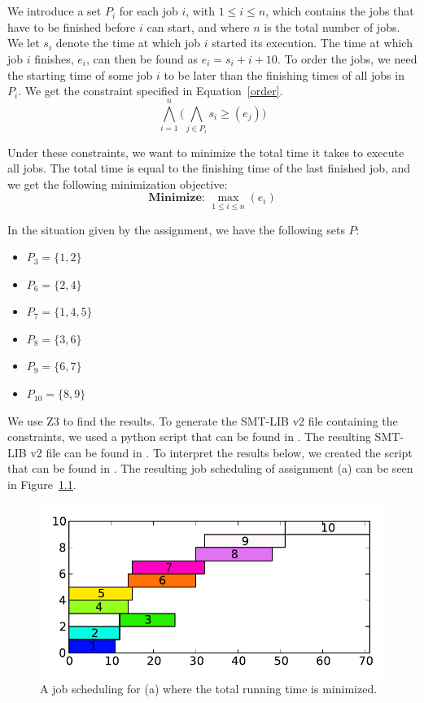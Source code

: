 \chapter{}\label{chp:3}
We introduce a set $P_i$ for each job $i$, with $1 \leq i \leq n$, which contains the jobs that have to be finished before $i$ can start, and where $n$ is the total number of jobs. We let $s_i$ denote the time at which job $i$ started its execution. The time at which job $i$ finishes, $e_i$, can then be found as $e_i = s_i + i + 10$. To order the jobs, we need the starting time of some job $i$ to be later than the finishing times of all jobs in $P_i$. We get the constraint specified in Equation~\ref{order}.
\begin{equation}
    \label{order}
    \bigwedge^{n}_{i=1}\big(\bigwedge_{j\in P_i} s_i \geq (e_j)\big)
\end{equation}

Under these constraints, we want to minimize the total time it takes to execute all jobs. The total time is equal to the finishing time of the last finished job, and we get the following minimization objective:
\begin{equation}
    \textbf{Minimize: }\max_{1\leq i \leq n}(e_i)
\end{equation}

In the situation given by the assignment, we have the following sets $P$:
\begin{itemize}
    \item $P_3 = \{1,2\}$
    \item $P_6 = \{2,4\}$
    \item $P_7 = \{1,4,5\}$
    \item $P_8 = \{3,6\}$
    \item $P_9 = \{6,7\}$
    \item $P_{10} = \{8,9\}$
\end{itemize}
We use Z3 to find the results. To generate the SMT-LIB v2 file containing the constraints, we used a python script that can be found in . The resulting SMT-LIB v2 file can be found in . To interpret the results below, we created the script that can be found in . The resulting job scheduling of assignment (a) can be seen in Figure~\ref{fig:3a}.
\begin{figure}[H]
    \centering
    \includegraphics[width=\columnwidth]{3/a_out.pdf}
    \caption{A job scheduling for (a) where the total running time is minimized.}
    \label{fig:3a}
\end{figure}


